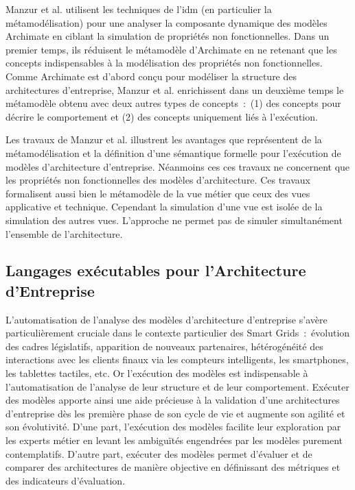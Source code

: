 Manzur et al. \cite{manzur2015xarchimate} utilisent les techniques de l'\gls{idm} (en particulier la métamodélisation) pour une analyser la composante dynamique des modèles Archimate en ciblant la simulation de propriétés non fonctionnelles. Dans un premier temps, ils réduisent le métamodèle  d'Archimate en ne retenant que les concepts indispensables à la modélisation des propriétés non fonctionnelles. Comme Archimate est d'abord conçu pour modéliser la structure des architectures d'entreprise, Manzur et al. \cite{manzur2015xarchimate} enrichissent dans un deuxième temps le métamodèle obtenu avec deux autres types de concepts~:~(1) des concepts pour décrire le comportement et (2) des concepts uniquement liés à l'exécution. 

Les travaux de Manzur et al. \cite{manzur2015xarchimate} illustrent les avantages que représentent de la métamodélisation et la définition d'une sémantique formelle pour l'exécution de modèles d'architecture d'entreprise. Néanmoins ces ces travaux ne concernent que les propriétés non fonctionnelles des modèles d'architecture. Ces travaux formalisent aussi bien le métamodèle de la vue métier  que ceux des vues applicative et technique. Cependant la simulation d'une vue est isolée de la simulation des autres vues. L'approche ne permet pas de simuler simultanément l'ensemble de l'architecture. 


%
%
%
%
%
%
%



\subsection{Langages exécutables pour l'Architecture d'Entreprise}

L'automatisation de l'analyse des modèles d'architecture d'entreprise s'avère particulièrement cruciale dans le contexte particulier des Smart Grids~:~évolution des cadres législatifs,  apparition de nouveaux partenaires, hétérogénéité des interactions avec les clients finaux via les compteurs intelligents, les smartphones, les tablettes tactiles, etc. Or l'exécution des modèles est indispensable à l'automatisation de l'analyse de leur structure et de leur comportement. Exécuter des modèles apporte ainsi une aide précieuse à la validation d'une architectures d'entreprise dès les première phase de son cycle de vie et augmente son agilité et son évolutivité. D'une part, l'exécution des modèles facilite leur exploration  par les experts métier en levant les ambiguïtés engendrées par les modèles purement contemplatifs. D'autre part, exécuter des modèles permet d'évaluer et de comparer des architectures de manière objective en définissant des métriques et des indicateurs d'évaluation. 


